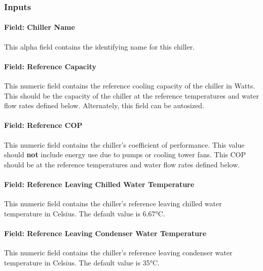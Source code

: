 \subsubsection{Inputs}\label{inputs-5-021}

\paragraph{Field: Chiller Name}\label{field-chiller-name-000}

This alpha field contains the identifying name for this chiller.

\paragraph{Field: Reference Capacity}\label{field-reference-capacity-1}

This numeric field contains the reference cooling capacity of the chiller in Watts. This should be the capacity of the chiller at the reference temperatures and water flow rates defined below. Alternately, this field can be autosized.

\paragraph{Field: Reference COP}\label{field-reference-cop-1}

This numeric field contains the chiller's coefficient of performance. This value should \textbf{not} include energy use due to pumps or cooling tower fans. This COP should be at the reference temperatures and water flow rates defined below.

\paragraph{Field: Reference Leaving Chilled Water Temperature}\label{field-reference-leaving-chilled-water-temperature-1}

This numeric field contains the chiller's reference leaving chilled water temperature in Celsius. The default value is 6.67°C.

\paragraph{Field: Reference Leaving Condenser Water Temperature}\label{field-reference-leaving-condenser-water-temperature}

This numeric field contains the chiller's reference leaving condenser water temperature in Celsius. The default value is 35°C.

